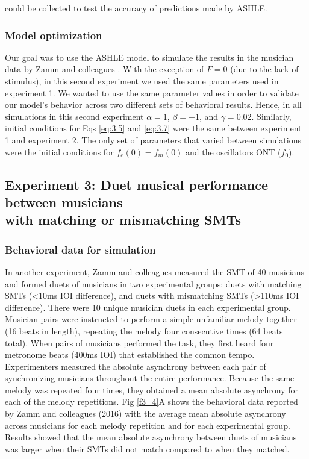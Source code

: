 \documentclass{report}
\begin{document}
could be collected to test the accuracy of predictions made by ASHLE.

\subsubsection{Model optimization}

Our goal was to use the ASHLE model to simulate the results in the musician data by Zamm and colleagues \cite{zamm2018musicians}. With the exception of $F = 0$	(due to the lack of stimulus), in this second experiment we used the same parameters used in experiment 1. We wanted to use the same parameter values in order to validate our model's behavior across two different sets of behavioral results. Hence, in all simulations in this second experiment $\alpha = 1$, $\beta = −1$, and $\gamma = 	0.02$. Similarly, initial conditions for Eqs \eqref{eq:3.5} and \eqref{eq:3.7} were the same between experiment 1 and experiment 2. The only set of parameters that varied between simulations were the initial conditions for $f_e(0)=f_m(0)$ and the oscillators ONT ($f_0$).

\subsection{Experiment 3: Duet musical performance between musicians \\ with matching or mismatching SMTs}

\subsubsection{Behavioral data for simulation}

In another experiment, Zamm and colleagues \cite{zamm2016endogenous} measured the SMT of 40 musicians and formed duets of musicians in two experimental groups: duets with matching SMTs (<10ms IOI difference), and duets with mismatching SMTs (>110ms IOI difference). There were 10 unique musician duets in each experimental group. Musician pairs were instructed to perform a simple unfamiliar melody together (16 beats in length), repeating the melody four consecutive times (64 beats total). When pairs of musicians performed the task, they first heard four metronome beats (400ms IOI) that established the common tempo. Experimenters measured the absolute asynchrony between each pair of synchronizing musicians throughout the entire performance. Because the same melody was repeated four times, they obtained a mean absolute asynchrony for each of the melody repetitions. Fig \ref{f3_4}A shows the behavioral data reported by Zamm and colleagues (2016) with the average mean absolute asynchrony across musicians for each melody repetition and for each experimental group. Results showed that the mean absolute asynchrony between duets of musicians was larger when their SMTs did not match compared to when they matched.
\end{document}
